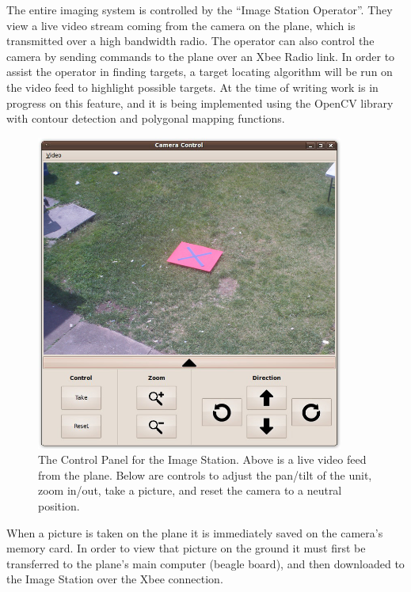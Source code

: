 \documentclass[10pt]{report}
\begin{document}
The entire imaging system is controlled by the ``Image Station Operator''.  They view a live video stream coming from the camera on the plane, which is transmitted over a high bandwidth radio.  The operator can also control the camera by sending commands to the plane over an Xbee Radio link.  In order to assist the operator in finding targets, a target locating algorithm will be run on the video feed to highlight possible targets.  At the time of writing work is in progress on this feature, and it is being implemented using the OpenCV library \cite{opencv} with contour detection and polygonal mapping functions.

\begin{figure} [H]
  \centering
  	\includegraphics[width=0.9\textwidth]{../images/ImageStationControls.jpg}
  	\caption[Image Station Control Panel]{The Control Panel for the Image Station.  Above is a live video feed from the plane.  Below are controls to adjust the pan/tilt of the unit, zoom in/out, take a picture, and reset the camera to a neutral position.}
  	\label{fig:imagestationcontrols}
\end{figure}

When a picture is taken on the plane it is immediately saved on the camera's memory card.  In order to view that picture on the ground it must first be transferred to the plane's main computer (beagle board), and then downloaded to the Image Station over the Xbee connection.
\end{document}
